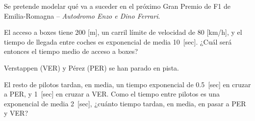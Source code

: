 \documentclass{upmassignment}
\date{\today}
\begin{document}
Se pretende modelar qué va a suceder en
el próximo Gran Premio de F1 de
Emilia-Romagna --
\textit{Autodromo Enzo e Dino Ferrari}.

\vspace{1em}


\begin{problemlist}
    \pbitem El acceso a boxes tiene
    200 [m], un carril
    límite de velocidad de
    80 [km/h], y el tiempo de llegada
    entre coches es exponencial de media
    10~[sec]. ¿Cuál será entonces el tiempo
    medio de acceso a boxes?

    \begin{solucion}
        
    \end{solucion}


    \pbitem Verstappen (VER)
    y Pérez (PER) se han parado en pista.

    \vspace{1em}
    \vspace{1em}

    El resto de pilotos 
    tardan, en media, un tiempo exponencial de
    0.5~[sec] en cruzar a PER, y 1~[sec] en
    cruzar a VER. Como el
    tiempo entre pilotos es una
    exponencial de media 2~[sec], ¿cuánto
    tiempo tardan, en media, en pasar a
    PER y VER?

    \begin{solucion}
        
    \end{solucion}



\end{problemlist}
\end{document}

